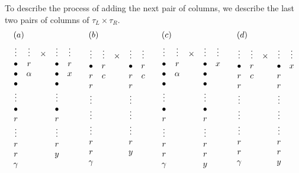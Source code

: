 \documentclass[11pt ,reqno]{amsart}
\begin{document}
To describe the process of adding the next pair of columns, we
describe the last two pairs of columns of $\tau_L\times \tau_R.$  
$$
\begin{aligned}
&(a)&&(b)&&(c)&&(d)\\
&\begin{matrix}
\vdots &\vdots&\times &\vdots &\vdots\\
\bullet &r& &\bullet&r\\
\bullet &{\alpha} & &\bullet&x\\
\bullet& & &\bullet&\\
\vdots && &\vdots&\\
\bullet&  & &\bullet&\\
r&&&r\\
\vdots && &\vdots&\\
r&&&r&\\
r&&&y&\\
\gamma&&&&
\end{matrix}
\quad
&&\begin{matrix}
\vdots &\vdots&\times &\vdots &\vdots\\
\bullet &r& &\bullet&r\\
r&c & &r&c\\
r&&&r\\
\vdots && &\vdots&\\
\vdots && &\vdots&\\
\vdots && &\vdots&\\
r&&&r&\\
r&&&y&\\
\gamma&&&&
\end{matrix}
\quad
&&\begin{matrix}
\vdots &\vdots&\times &\vdots &\vdots\\
\bullet &r& &\bullet&x\\
\bullet &{\alpha} & &\bullet&\\
\bullet& & &\bullet&\\
\vdots && &\vdots&\\
\bullet&  & &\bullet&\\
r&&&r\\
\vdots && &\vdots&\\
r&&&r&\\
r&&&r&\\
\gamma&&&y&
\end{matrix}
\quad
&&\begin{matrix}
\vdots &\vdots&\times &\vdots &\vdots\\
\bullet &r& &\bullet&x\\
r&c & &r&\\
r&&&r\\
\vdots && &\vdots&\\
\vdots && &\vdots&\\
\vdots && &\vdots&\\
r&&&r&\\
r&&&r&\\
\gamma&&&y&
\end{matrix}
\end{aligned}
$$
\end{document}
